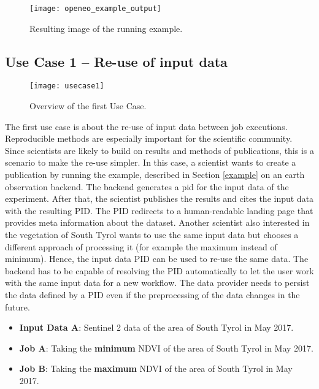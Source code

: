 \documentclass[draft,final]{vutinfth} %
\begin{document}
\begin{figure}[h]
	\centering
	\texttt{[image: openeo\_example\_output]}
	\caption{Resulting image of the running example.}
	\label{fig:example} %
\end{figure}


\subsection{Use Case 1 – Re-use of input data}\label{UseCase1}
\begin{figure}[h]
	\centering
	\texttt{[image: usecase1]}
	\caption{Overview of the first Use Case.}
	\label{fig:usecase1} %
\end{figure}
The first use case is about the re-use of input data between job executions. Reproducible methods are especially important for the scientific community. Since scientists are likely to build on results and methods of publications, this is a scenario to make the re-use simpler. In this case, a scientist wants to create a publication by running the example, described in Section \ref{example} on an earth observation backend. The backend generates a \gls{pid} for the input data of the experiment. After that, the scientist publishes the results and cites the input data with the resulting PID. The PID redirects to a human-readable landing page that provides meta information about the dataset. Another scientist also interested in the vegetation of South Tyrol wants to use the same input data but chooses a different approach of processing it (for example the maximum instead of minimum). Hence, the input data PID can be used to re-use the same data. The backend has to be capable of resolving the PID automatically to let the user work with the same input data for a new workflow. The data provider needs to persist the data defined by a PID even if the preprocessing of the data changes in the future.   

\begin{itemize}
	\item \textbf{Input Data A}: Sentinel 2 data of the area of South Tyrol in May 2017. 
	\item \textbf{Job A}: Taking the \textbf{minimum} NDVI of the area of South Tyrol in May 2017. 
	\item \textbf{Job B}: Taking the \textbf{maximum} NDVI of the area of South Tyrol in May 2017.
\end{itemize}
\end{document}
